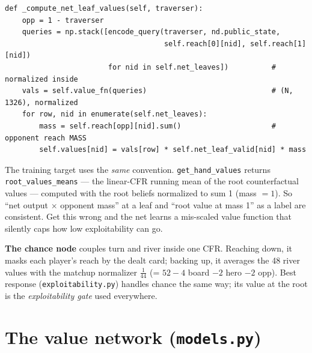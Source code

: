 \documentclass[11pt,a4paper]{article}
\newcommand{\file}[1]{\textcolor{accent}{\texttt{#1}}}
\newcommand{\fn}[1]{\texttt{#1}}
\begin{document}
\begin{lstlisting}[style=py, caption={\file{subgame\_solver.py} --- the leaf-value scaling trick, the single most important detail. The net outputs values assuming the opponent belief is normalized to sum 1; the solver recovers the true counterfactual leaf value by multiplying by the opponent's reach \emph{mass} at that leaf. This decoupling lets one net generalize across subgames with wildly different reach magnitudes.}]
def _compute_net_leaf_values(self, traverser):
    opp = 1 - traverser
    queries = np.stack([encode_query(traverser, nd.public_state,
                                     self.reach[0][nid], self.reach[1][nid])
                        for nid in self.net_leaves])          # normalized inside
    vals = self.value_fn(queries)                             # (N, 1326), normalized
    for row, nid in enumerate(self.net_leaves):
        mass = self.reach[opp][nid].sum()                     # opponent reach MASS
        self.values[nid] = vals[row] * self.net_leaf_valid[nid] * mass
\end{lstlisting}

\begin{trap}
The training target uses the \emph{same} convention. \fn{get\_hand\_values}
returns \texttt{root\_values\_means} --- the linear-CFR running mean of the root
counterfactual values --- computed with the root beliefs normalized to sum 1
(mass $=1$). So ``net output $\times$ opponent mass'' at a leaf and ``root value
at mass 1'' as a label are consistent. Get this wrong and the net learns a
mis-scaled value function that silently caps how low exploitability can go.
\end{trap}

\textbf{The chance node} couples turn and river inside one CFR. Reaching down, it
masks each player's reach by the dealt card; backing up, it averages the 48 river
values with the matchup normalizer $\tfrac{1}{44}$ (= $52-4$ board $-2$ hero $-2$
opp). Best response (\file{exploitability.py}) handles chance the same way; its
value at the root is the \emph{exploitability gate} used everywhere.

\section{The value network (\file{models.py})}
\end{document}
